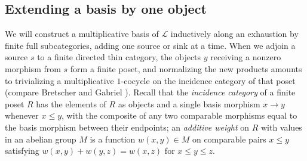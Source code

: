 \subsection{Extending a basis by one object}

We will construct a multiplicative basis of $\mathcal L$ inductively along an
exhaustion by finite full subcategories, adding one source or sink at a time.
When we adjoin a source $s$ to a finite directed thin category, the objects
$y$ receiving a nonzero morphism from $s$ form a finite poset, and
normalizing the new products amounts to trivializing a multiplicative
$1$-cocycle on the incidence category of that poset (compare Bretscher and
Gabriel \cite[Section~2.6]{BretscherGabriel}). Recall that the
\emph{incidence category} of a finite poset $R$ has the elements of $R$ as
objects and a single basis morphism $x\to y$ whenever $x\leq y$, with the
composite of any two comparable morphisms equal to the basis morphism between
their endpoints; an \emph{additive weight} on $R$ with values in an abelian
group $M$ is a function $w(x,y)\in M$ on comparable pairs $x\leq y$
satisfying $w(x,y)+w(y,z)=w(x,z)$ for $x\leq y\leq z$.

